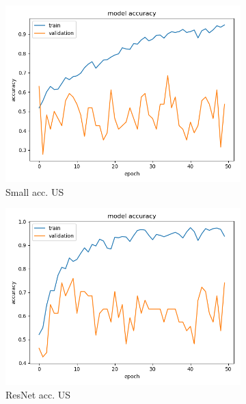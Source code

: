 \begin{figure}[h]
\centering
\begin{subfigure}[b]{.24\linewidth}
\includegraphics[width=\linewidth]{Figs/small_us_acc.jpg}
\caption{Small acc. US}
\end{subfigure}
\begin{subfigure}[b]{.24\linewidth}
\includegraphics[width=\linewidth]{Figs/resnet_us_acc.jpg}
\caption{ResNet acc. US}
\end{subfigure}
\begin{subfigure}[b]{.24\linewidth}

\end{subfigure}
\end{figure}
